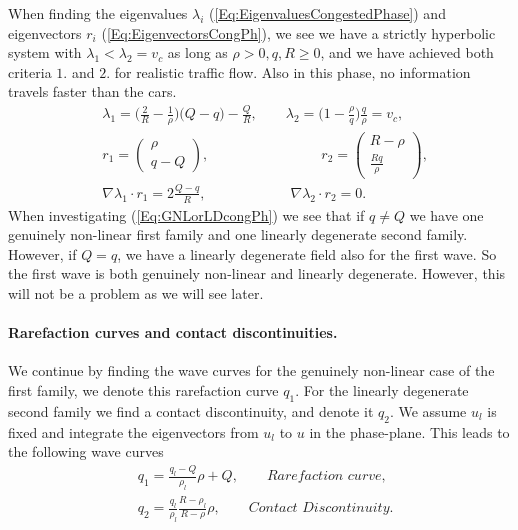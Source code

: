 \documentclass[10pt]{article}
\numberwithin{equation}{section}
\begin{document}
When finding the eigenvalues $\lambda_i$ (\ref{Eq:EigenvaluesCongestedPhase}) and eigenvectors $r_i$ (\ref{Eq:EigenvectorsCongPh}), we see we have a strictly hyperbolic system with $\lambda_1 < \lambda_2 = v_c$ as long as $\rho > 0, q, R \geq 0$, and we have achieved both criteria $1. $ and $2.$ for realistic traffic flow.  Also in this phase, no information travels faster than the cars. 
\begin{align}
    &\lambda_1 = \big ( \frac{2}{R} - \frac{1}{\rho} )\big (Q- q) - \frac{Q}{R} , \quad \quad \lambda_2 = \big(1 - \frac{\rho}{q}\big)\frac{q}{\rho} = v_c , \label{Eq:EigenvaluesCongestedPhase} \\
    & r_1 = \begin{pmatrix} \rho \\ q - Q \end{pmatrix}, \quad \quad \quad  \quad \quad \quad \quad \quad  r_2 = \begin{pmatrix} R - \rho \\ \frac{Rq}{\rho} \end{pmatrix} , \label{Eq:EigenvectorsCongPh} \\
    & \nabla \lambda_1 \cdot r_1 = 2\frac{Q-q}{R}, \quad \quad \quad \quad \quad  \quad \nabla \lambda_2 \cdot r_2 = 0 . \label{Eq:GNLorLDcongPh}
\end{align}
When investigating (\ref{Eq:GNLorLDcongPh}) we see that if $q \neq Q$ we have one genuinely non-linear first family and one linearly degenerate second family. However, if $ Q = q$, we have a linearly degenerate field also for the first wave. So the first wave is both genuinely non-linear and linearly degenerate. However, this will not be a problem as we will see later.

\paragraph{Rarefaction curves and contact discontinuities.}
We continue by finding the wave curves for the genuinely non-linear case of the first family, we denote this rarefaction curve $q_1$. For the linearly degenerate second family we find a contact discontinuity, and denote it $q_2$. We assume $u_l$ is fixed and integrate the eigenvectors from $u_l$ to $u$ in the phase-plane. This leads to the following wave curves
\begin{align}
    & q_1 = \frac{q_l - Q}{\rho_l} \rho + Q, \quad \quad \textit{Rarefaction curve,}
    \label{Eq:RarefactionWCongestedPh} \\
    &  q_2 = \frac{q_l}{\rho_l} \frac{R - \rho_l}{R- \rho} \rho,   \quad \quad \textit{Contact Discontinuity.}
    \label{Eq:ContactDiscCongestedPh}
\end{align}
\end{document}
